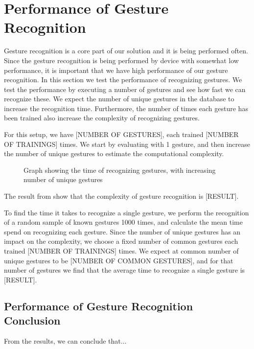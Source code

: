\section{Performance of Gesture Recognition}
Gesture recognition is a core part of our solution and it is being performed often. 
Since the gesture recognition is being performed by device with somewhat low performance,
it is important that we have high performance of our gesture recognition. 
In this section we test the performance of recognizing gestures. 
We test the performance by executing a number of gestures and see how fast we can recognize these.  
We expect the number of unique gestures in the database to increase the recognition time. 
Furthermore, the number of times each gesture has been trained also increase the complexity of recognizing gestures. %

For this setup, we have [NUMBER OF GESTURES], each trained [NUMBER OF TRAININGS] times. 
We start by evaluating with \num{1} gesture, and then increase the number of unique gestures to estimate the computational complexity.

\begin{figure}[!htb]
    \centering
    \caption{Graph showing the time of recognizing gestures, with increasing number of unique gestures}
    \label{fig:performancegraph}
\end{figure}

The result from  show that the complexity of gesture recognition is [RESULT]. 

To find the time it takes to recognize a single gesture, 
we perform the recognition of a random sample of known gestures \num{1000} times, 
and calculate the mean time spend on recognizing each gesture. 
Since the number of unique gestures has an impact on the complexity, 
we choose a fixed number of common gestures each trained [NUMBER OF TRAININGS] times. 
We expect at common number of unique gestures to be [NUMBER OF COMMON GESTURES], 
and for that number of gestures we find that the average time to recognize a single gesture is [RESULT]. 

\subsection{Performance of Gesture Recognition Conclusion}
From the results, we can conclude that... 
